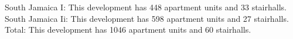 {South Jamaica I}: This development has 448 apartment units and 33 stairhalls.\\{South Jamaica Ii}: This development has 598 apartment units and 27 stairhalls.\\{Total}: This development has 1046 apartment units and 60 stairhalls.\\